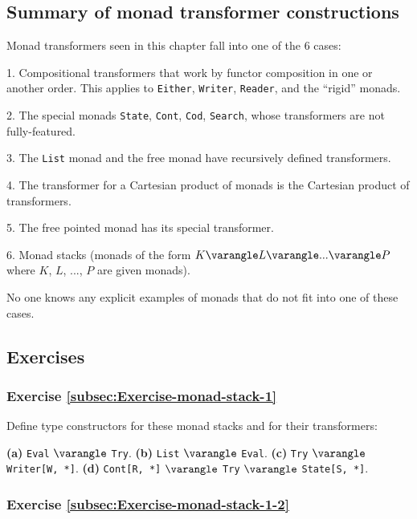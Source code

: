 \subsection{Summary of monad transformer constructions}

Monad transformers seen in this chapter fall into one of the 6 cases:

1. Compositional transformers that work by functor composition in
one or another order. This applies to \lstinline!Either!, \lstinline!Writer!,
\lstinline!Reader!, and the \textsf{``}rigid\textsf{''} monads.

2. The special monads \lstinline!State!, \lstinline!Cont!, \lstinline!Cod!,
\lstinline!Search!, whose transformers are not fully-featured.

3. The \lstinline!List! monad and the free monad have recursively
defined transformers.

4. The transformer for a Cartesian product of monads is the Cartesian
product of transformers.

5. The free pointed monad has its special transformer.

6. Monad stacks (monads of the form $K\varangle L\varangle...\varangle P$
where $K$, $L$, ..., $P$ are given monads).

No one knows any explicit examples of monads that do not fit into
one of these cases.

\subsection{Exercises}

\subsubsection{Exercise \label{subsec:Exercise-monad-stack-1}\ref{subsec:Exercise-monad-stack-1}}

Define type constructors for these monad stacks and for their transformers:

\textbf{(a)} \lstinline!Eval! $\varangle$ \lstinline!Try!.\textbf{
(b)} \lstinline!List! $\varangle$ \lstinline!Eval!.\textbf{ (c)}
\lstinline!Try! $\varangle$ \lstinline!Writer[W, *]!.\textbf{ (d)}
\lstinline!Cont[R, *]! $\varangle$ \lstinline!Try! $\varangle$
\lstinline!State[S, *]!.

\subsubsection{Exercise \label{subsec:Exercise-monad-stack-1-2}\ref{subsec:Exercise-monad-stack-1-2}}

